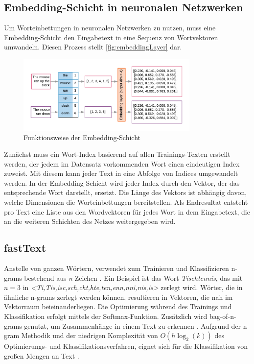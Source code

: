 \subsection*{Embedding-Schicht in neuronalen Netzwerken}

Um Worteinbettungen in neuronalen Netzwerken zu nutzen, muss eine Embedding-Schicht den Eingabetext in eine Sequenz von Wortvektoren umwandeln. Diesen Prozess stellt \autoref{fig:embeddingLayer} dar.

\begin{figure}[H]
  \centering
  \includegraphics[width=0.8\textwidth]{data/images/embedding_layer.png}
  \caption{Funktionsweise der Embedding-Schicht \autocite{google_prepare_2022}} \label{fig:embeddingLayer}
\end{figure}

Zunächst muss ein Wort-Index basierend auf allen Trainings-Texten erstellt werden, der jedem im Datensatz vorkommenden Wort einen eindeutigen Index zuweist. Mit diesem kann jeder Text in eine Abfolge von Indices umgewandelt werden. In der Embedding-Schicht wird jeder Index durch den Vektor, der das entsprechende Wort darstellt, ersetzt. Die Länge des Vektors ist abhängig davon, welche Dimensionen die Worteinbettungen bereitstellen. Als Endresultat entsteht pro Text eine Liste aus den Wordvektoren für jedes Wort in dem Eingabetext, die an die weiteren Schichten des Netzes weitergegeben wird.

\subsection*{fastText}

Anstelle von ganzen Wörtern, verwendet \ft zum Trainieren und Klassifizieren n-grams bestehend aus \textit{n} Zeichen \autocite{kowsari_text_2019, joulin_fasttextzip_2016}. Ein Beispiel ist das Wort \textit{Tischtennis}, das mit \(n = 3\) in \textit{<Ti,Tis,isc,sch,cht,hte,ten,enn,nni,nis,is>} zerlegt wird. Wörter, die in ähnliche n-grams zerlegt werden können, resultieren in Vektoren, die nah im Vektorraum beieinanderliegen. Die Optimierung während des Trainings und Klassifikation erfolgt mittels der Softmax-Funktion. Zusätzlich wird bag-of-n-grams genutzt, um Zusammenhänge in einem Text zu erkennen \autocite[2]{joulin_bag_2016}. Aufgrund der n-gram Methodik und der niedrigen Komplexität von \(O(h \log_{2}(k))\) des Optimierungs- und Klassifikationsverfahren, eignet sich \ft für die Klassifikation von großen Mengen an Text \autocite[2\psqq]{joulin_bag_2016}.

